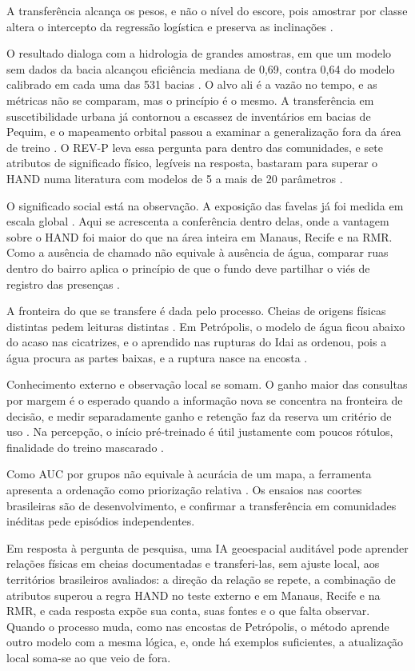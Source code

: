 \documentclass[conference]{IEEEtran}
\makeatletter
\def\section{\@startsection{section}{1}{\z@}{1.7ex plus .4ex minus .2ex}{0.5ex plus .2ex}{\normalfont\normalsize\centering\scshape}}
\makeatother
\begin{document}
A transferência alcança os pesos, e não o nível do escore, pois amostrar por classe altera o intercepto da regressão logística e preserva as inclinações \cite{prentice}.

O resultado dialoga com a hidrologia de grandes amostras, em que um modelo sem dados da bacia alcançou eficiência mediana de 0,69, contra 0,64 do modelo calibrado em cada uma das 531 bacias \cite{kratzertw}. O alvo ali é a vazão no tempo, e as métricas não se comparam, mas o princípio é o mesmo. A transferência em suscetibilidade urbana já contornou a escassez de inventários em bacias de Pequim, e o mapeamento orbital passou a examinar a generalização fora da área de treino \cite{zhao,ratte}. O REV-P leva essa pergunta para dentro das comunidades, e sete atributos de significado físico, legíveis na resposta, bastaram para superar o HAND numa literatura com modelos de 5 a mais de 20 parâmetros \cite{islam}.

O significado social está na observação. A exposição das favelas já foi medida em escala global \cite{lislum}. Aqui se acrescenta a conferência dentro delas, onde a vantagem sobre o HAND foi maior do que na área inteira em Manaus, Recife e na RMR. Como a ausência de chamado não equivale à ausência de água, comparar ruas dentro do bairro aplica o princípio de que o fundo deve partilhar o viés de registro das presenças \cite{phillips}.

A fronteira do que se transfere é dada pelo processo. Cheias de origens físicas distintas pedem leituras distintas \cite{merz}. Em Petrópolis, o modelo de água ficou abaixo do acaso nas cicatrizes, e o aprendido nas rupturas do Idai as ordenou, pois a água procura as partes baixas, e a ruptura nasce na encosta \cite{dille}.

Conhecimento externo e observação local se somam. O ganho maior das consultas por margem é o esperado quando a informação nova se concentra na fronteira de decisão, e medir separadamente ganho e retenção faz da reserva um critério de uso \cite{lopezpaz}. Na percepção, o início pré-treinado é útil justamente com poucos rótulos, finalidade do treino mascarado \cite{mae}.

Como AUC por grupos não equivale à acurácia de um mapa, a ferramenta apresenta a ordenação como priorização relativa \cite{wadoux}. Os ensaios nas coortes brasileiras são de desenvolvimento, e confirmar a transferência em comunidades inéditas pede episódios independentes.

\section{Conclusão}
Em resposta à pergunta de pesquisa, uma IA geoespacial auditável pode aprender relações físicas em cheias documentadas e transferi-las, sem ajuste local, aos territórios brasileiros avaliados: a direção da relação se repete, a combinação de atributos superou a regra HAND no teste externo e em Manaus, Recife e na RMR, e cada resposta expõe sua conta, suas fontes e o que falta observar. Quando o processo muda, como nas encostas de Petrópolis, o método aprende outro modelo com a mesma lógica, e, onde há exemplos suficientes, a atualização local soma-se ao que veio de fora.
\end{document}
